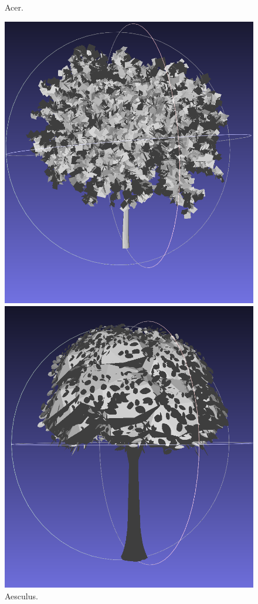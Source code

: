 \documentclass[12pt]{article}
\begin{document}
\begin{figure}[H]
\begin{minipage}{0.24\textwidth}
        \caption{Acer.}
    \end{minipage}\hfill
    \begin{minipage}{0.24\textwidth}
        \centering
        \includegraphics[width=\textwidth]{images/aesculus.png}
        \caption{Aesculus.}
    \end{minipage}\hfill
    \begin{minipage}{0.24\textwidth}
        \centering
        \includegraphics[width=\textwidth]{images/catalpa.png}

\end{minipage}
\end{figure}
\end{document}
